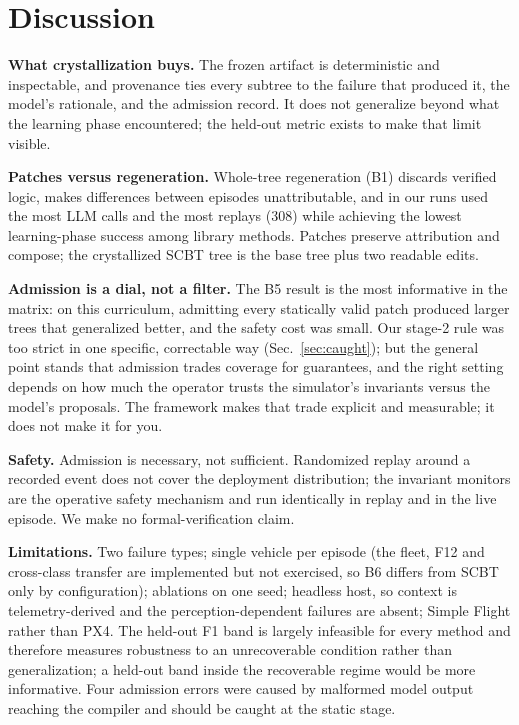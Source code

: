 \documentclass[conference]{IEEEtran}
\begin{document}
\section{Discussion}
\label{sec:discussion}

\textbf{What crystallization buys.} The frozen artifact is deterministic and inspectable, and provenance ties every subtree to the failure that produced it, the model's rationale, and the admission record. It does not generalize beyond what the learning phase encountered; the held-out metric exists to make that limit visible.

\textbf{Patches versus regeneration.} Whole-tree regeneration (B1) discards verified logic, makes differences between episodes unattributable, and in our runs used the most LLM calls and the most replays (308) while achieving the lowest learning-phase success among library methods. Patches preserve attribution and compose; the crystallized SCBT tree is the base tree plus two readable edits.

\textbf{Admission is a dial, not a filter.} The B5 result is the most informative in the matrix: on this curriculum, admitting every statically valid patch produced larger trees that generalized better, and the safety cost was small. Our stage-2 rule was too strict in one specific, correctable way (Sec.~\ref{sec:caught}); but the general point stands that admission trades coverage for guarantees, and the right setting depends on how much the operator trusts the simulator's invariants versus the model's proposals. The framework makes that trade explicit and measurable; it does not make it for you.

\textbf{Safety.} Admission is necessary, not sufficient. Randomized replay around a recorded event does not cover the deployment distribution; the invariant monitors are the operative safety mechanism and run identically in replay and in the live episode. We make no formal-verification claim.

\textbf{Limitations.} Two failure types; single vehicle per episode (the fleet, F12 and cross-class transfer are implemented but not exercised, so B6 differs from SCBT only by configuration); ablations on one seed; headless host, so context is telemetry-derived and the perception-dependent failures are absent; Simple Flight rather than PX4. The held-out F1 band is largely infeasible for every method and therefore measures robustness to an unrecoverable condition rather than generalization; a held-out band inside the recoverable regime would be more informative. Four admission errors were caused by malformed model output reaching the compiler and should be caught at the static stage.
\end{document}
